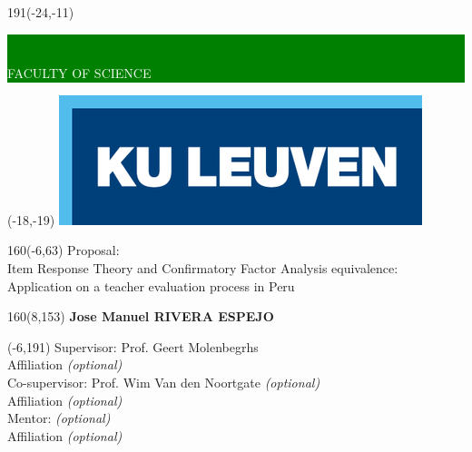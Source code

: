 \documentclass[12pt,a4paper,oneside]{article}
\begin{document}
%
\graphicspath{{./images/}} 	          %
%
\thispagestyle{empty}
\newcommand{\form}[1]{\scalebox{1.087}{\boldmath{#1}}}
\sffamily
%
\begin{textblock}{191}(-24,-11)
\colorbox{green}{\hspace{139mm}\ \parbox[c][18truemm]{52mm}{\textcolor{white}{FACULTY OF SCIENCE}}}
\end{textblock}
%
\begin{textblock}{70}(-18,-19)
\textblockcolour{}
\includegraphics*[height=19.8truemm]{LogoKULeuven}
\end{textblock}
%
\begin{textblock}{160}(-6,63)
\textblockcolour{}
\vspace{-\parskip}
\flushleft
\fontsize{40}{42}\selectfont \textcolor{bluetitle}{Proposal:}\\[1.5mm]
\fontsize{20}{22}\selectfont Item Response Theory and Confirmatory Factor Analysis equivalence: Application on a teacher evaluation process in Peru \\
\end{textblock}
%
\begin{textblock}{160}(8,153)
\textblockcolour{}
\vspace{-\parskip}
\flushright
\fontsize{14}{16}\selectfont \textbf{Jose Manuel RIVERA ESPEJO}
\end{textblock}
%
\begin{textblock}{70}(-6,191)
\textblockcolour{}
\vspace{-\parskip}
\flushleft
Supervisor: Prof. Geert Molenbegrhs \\[-2pt]
\textcolor{blueaff}{Affiliation \textsl{(optional)}}\\[5pt]
Co-supervisor: Prof. Wim Van den Noortgate \textsl{(optional)}\\[-2pt]
\textcolor{blueaff}{Affiliation \textsl{(optional)}}\\[5pt]
Mentor: \textsl{(optional)}\\[-2pt]
\textcolor{blueaff}{Affiliation \textsl{(optional)}}\\
\end{textblock}
\end{document}
